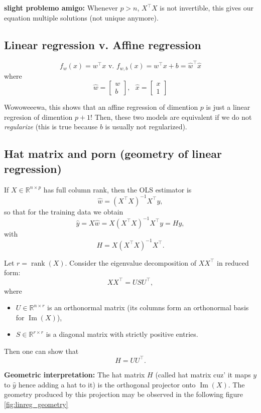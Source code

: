 \textbf{slight problemo amigo:} Whenever $p > n$, $X^\top X$ is not invertible, this gives our equation multiple solutions (not unique anymore).

\subsection*{Linear regression v. Affine regression}
$$f_w (x) = w^\top x \text{     v.     } f_{w, b} (x) = w^\top x + b = \hat{w}^\top \hat{x}$$
where
$$\hat{w} = \begin{bmatrix}
    w \\ b
\end{bmatrix}, \text{   } \hat{x} = \begin{bmatrix}
    x \\ 1
\end{bmatrix}$$

\begin{remark}
    Wowoweeewa, this shows that an affine regression of dimention $p$ is just a linear regresion of dimention $p + 1$! Then, these two models are equivalent if we do not \textit{regularize}
    (this is true because $b$ is usually not regularized).
\end{remark}

\subsection*{Hat matrix and porn (geometry of linear regression)}
If $X\in\mathbb{R}^{n\times p}$ has full column rank, then the OLS estimator is
\[
\hat w = (X^\top X)^{-1}X^\top y,
\]
so that for the training data we obtain
\[
\hat y = X\hat w = X(X^\top X)^{-1}X^\top y = Hy,
\]
with
\[
H = X(X^\top X)^{-1}X^\top.
\]

\medskip

\noindent
Let $r = \operatorname{rank}(X)$. Consider the eigenvalue decomposition of $XX^\top$ in reduced form:
\[
XX^\top = USU^\top,
\]
where
\begin{itemize}
  \item $U \in \mathbb{R}^{n\times r}$ is an orthonormal matrix (its columns form an orthonormal basis for $\operatorname{Im}(X)$),
  \item $S \in \mathbb{R}^{r\times r}$ is a diagonal matrix with strictly positive entries.
\end{itemize}
Then one can show that
\[
H = UU^\top.
\]

\medskip

\noindent
\textbf{Geometric interpretation:} The hat matrix $H$ (called hat matrix cuz' it maps $y$ to $\hat y$ hence adding a hat to it) is the orthogonal projector onto $\operatorname{Im}(X)$.
The geometry produced by this projection may be observed in the following figure \ref{fig:linreg_geometry}

